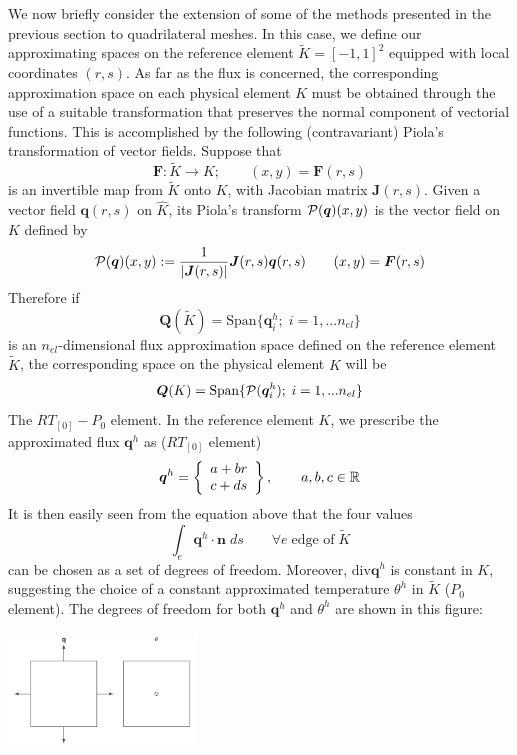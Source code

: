 \begin{itemize}
\begin{displayquote}
{We now briefly consider the extension of some of the
methods presented in the previous section to quadrilateral
meshes. In this case, we define our approximating spaces
on the reference element $\tilde{K} = [-1,1]^2$ equipped with local
coordinates $(r,s)$. As far as the flux is concerned, the corresponding 
approximation space on each physical element $K$
must be obtained through the use of a suitable transformation
that preserves the normal component of vectorial functions.
This is accomplished by the following (contravariant) Piola's
transformation of vector fields. Suppose that
\[
{\bm F}:\tilde{K} \rightarrow K; 
\qquad
(x,y) = {\bm F}(r,s)
\]
is an invertible map from $\tilde{K}$ onto $K$, with Jacobian matrix
${\bm J}(r,s)$. Given a vector field ${\bm q}(r,s)$ on $\hat{K}$, 
its Piola's transform ${\cal P}({\bm q})(x,y)$ is the vector field on $K$
defined by
\[
{\cal P}({\bm q})(x,y) := \frac{1}{|{\bm J}(r,s)|} {\bm J}(r,s) {\bm q}(r,s)
\qquad 
(x,y)={\bm F}(r,s)
\]
Therefore if
\[
{\bm Q}(\tilde{K})=\text{Span}\{ {\bm q}_i^h; \; i=1,...n_{el}  \}
\]
is an $n_{el}$-dimensional flux approximation space defined on the
reference element $\tilde{K}$, the corresponding space on the physical
element $K$ will be
\[
{\bm Q}(K)=\text{Span}\{{\cal P} ({\bm q}_i^h); \; i=1,...n_{el}  \}
\]
The $RT_{[0]}-P_0$ element. In the reference element $K$, 
we prescribe the approximated flux ${\bm q}^h$  as ($RT_{[0]}$ element)
\[
{\bm q}^h = 
\left\{
\begin{array}{c}
a+br \\ c+ds
\end{array}
\right\}
, \qquad a,b,c\in {\mathbb{R}}
\]
It is then easily seen from the equation above that the four values
\[
\int_e {\bm q}^h \cdot {\bm n} \; ds 
\qquad \forall e \; \text{edge of} \; \tilde{K}
\]
can be chosen as a set of degrees of freedom. Moreover,
$\text{div} {\bm q}^h$ is constant in $K$,
suggesting the choice of a constant approximated temperature 
$\theta^h$ in $\tilde{K}$ ($P_0$ element). The
degrees of freedom for both ${\bm q}^h$ and $\theta^h$ are shown in
this figure:

\begin{center}
\includegraphics[width=5cm]{images/pair_raviart-thomas/aubb17b}
\end{center}

}
\end{displayquote}
\end{itemize}
